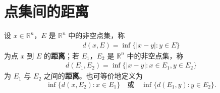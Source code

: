 \documentclass[../../main.tex]{subfiles}
\begin{document}
\section{点集间的距离}

\begin{definition}
设 \(x\in\mathbb{R}^n\)，\(E\) 是 \(\mathbb{R}^n\) 中的非空点集，称
\begin{align*}
d(x,E)=\inf\{|x - y|: y\in E\}
\end{align*}
为点 \(x\) 到 \(E\) 的\textbf{距离}；若 \(E_1\)，\(E_2\) 是 \(\mathbb{R}^n\) 中的非空点集，称
\begin{align*}
d(E_1,E_2)=\inf\{|x - y|: x\in E_1, y\in E_2\}
\end{align*}
为 \(E_1\) 与 \(E_2\) 之间的\textbf{距离}。也可等价地定义为
\[
\inf\{d(x,E_2): x\in E_1\} \quad \text{或} \quad \inf\{d(E_1,y): y\in E_2\}.
\] 
\end{definition}
\end{document}
